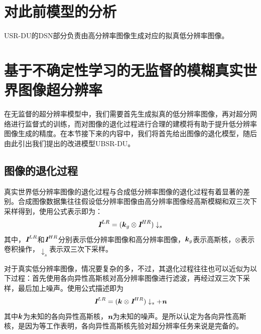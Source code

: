 \section{对此前模型的分析}

USR-DU的DSN部分负责由高分辨率图像生成对应的拟真低分辨率图像。
\section{基于不确定性学习的无监督的模糊真实世界图像超分辨率}
在无监督的超分辨率模型中，我们需要首先生成拟真的低分辨率图像，再对超分网络进行监督式的训练，而对图像的退化过程进行合理的建模将有助于提升低分辨率图像生成的精度。在本节接下来的内容中，我们将首先给出图像的退化模型，随后由此引出我们提出的改进模型UBSR-DU。
\subsection{图像的退化过程}
真实世界低分辨率图像的退化过程与合成低分辨率图像的退化过程有着显著的差别。合成图像数据集往往假设低分辨率图像由高分辨率图像经高斯模糊和双三次下采样得到，使用公式表示即为：
\begin{equation}
    \textbf{\em I}^{LR}=(\vb*{k}_g\otimes \textbf{\em I}^{HR})\downarrow_s
\end{equation}
其中，$\textbf{\em I}^{LR}$和$\textbf{\em I}^{HR}$分别表示低分辨率图像和高分辨率图像，$\vb*{k}_g$表示高斯核，$\otimes$表示卷积操作，$\downarrow_s$表示双三次下采样。

对于真实低分辨率图像，情况要复杂的多，不过，其退化过程往往也可以近似为以下过程：首先使用各向异性高斯核对高分辨率图像进行滤波，再经过双三次下采样，最后加上噪声。使用公式描述即为
\begin{equation}
    \textbf{\em I}^{LR}=(\vb*{k}\otimes \textbf{\em I}^{HR})\downarrow_s+\textbf{\em n}
\end{equation}
其中$\vb*{k}$为未知的各向异性高斯核，$\textbf{\em n}$为未知的噪声。是所以认定为各向异性高斯核，是因为\parencite{Gau_1}\parencite{Gau_2}\parencite{Gau_3}\parencite{Gau_4}\parencite{Gau_5}等工作表明，各向异性高斯核先验对超分辨率任务来说是完备的。

